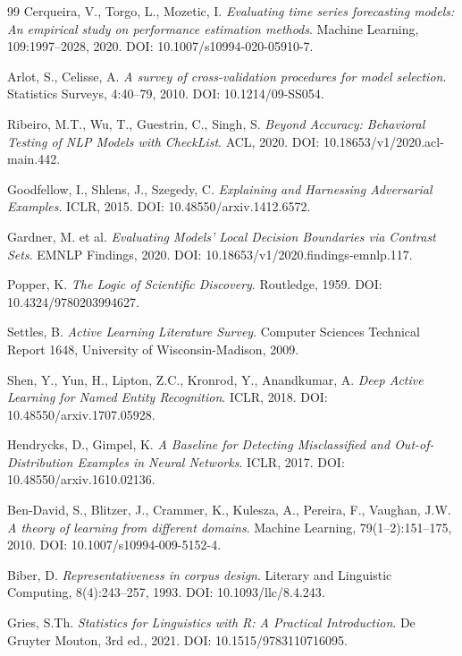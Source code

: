 \documentclass[12pt,a4paper]{article}
\theoremstyle{remark}
\begin{document}
\begin{thebibliography}{99}
Cerqueira, V., Torgo, L., Mozetic, I. \textit{Evaluating time series forecasting models: An empirical study on performance estimation methods}. Machine Learning, 109:1997--2028, 2020. DOI: 10.1007/s10994-020-05910-7.

Arlot, S., Celisse, A. \textit{A survey of cross-validation procedures for model selection}. Statistics Surveys, 4:40--79, 2010. DOI: 10.1214/09-SS054.

Ribeiro, M.T., Wu, T., Guestrin, C., Singh, S. \textit{Beyond Accuracy: Behavioral Testing of NLP Models with CheckList}. ACL, 2020. DOI: 10.18653/v1/2020.acl-main.442.

Goodfellow, I., Shlens, J., Szegedy, C. \textit{Explaining and Harnessing Adversarial Examples}. ICLR, 2015. DOI: 10.48550/arxiv.1412.6572.

Gardner, M. et al. \textit{Evaluating Models' Local Decision Boundaries via Contrast Sets}. EMNLP Findings, 2020. DOI: 10.18653/v1/2020.findings-emnlp.117.

Popper, K. \textit{The Logic of Scientific Discovery}. Routledge, 1959. DOI: 10.4324/9780203994627.

Settles, B. \textit{Active Learning Literature Survey}. Computer Sciences Technical Report 1648, University of Wisconsin-Madison, 2009.

Shen, Y., Yun, H., Lipton, Z.C., Kronrod, Y., Anandkumar, A. \textit{Deep Active Learning for Named Entity Recognition}. ICLR, 2018. DOI: 10.48550/arxiv.1707.05928.

Hendrycks, D., Gimpel, K. \textit{A Baseline for Detecting Misclassified and Out-of-Distribution Examples in Neural Networks}. ICLR, 2017. DOI: 10.48550/arxiv.1610.02136.

Ben-David, S., Blitzer, J., Crammer, K., Kulesza, A., Pereira, F., Vaughan, J.W. \textit{A theory of learning from different domains}. Machine Learning, 79(1--2):151--175, 2010. DOI: 10.1007/s10994-009-5152-4.

Biber, D. \textit{Representativeness in corpus design}. Literary and Linguistic Computing, 8(4):243--257, 1993. DOI: 10.1093/llc/8.4.243.

Gries, S.Th. \textit{Statistics for Linguistics with R: A Practical Introduction}. De Gruyter Mouton, 3rd ed., 2021. DOI: 10.1515/9783110716095.


\end{thebibliography}
\end{document}
